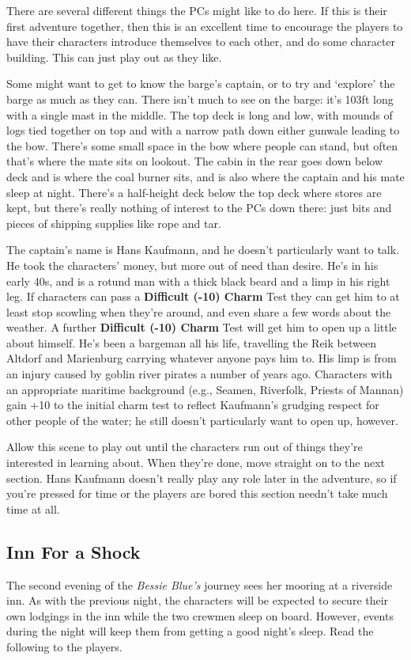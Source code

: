 There are several different things the PCs might like to do here. If this is
their first adventure together, then this is an excellent time to encourage the
players to have their characters introduce themselves to each other, and do some
character building. This can just play out as they like.

Some might want to get to know the barge's captain, or to try and `explore' the
barge as much as they can. There isn't much to see on the barge: it's 103ft long
with a single mast in the middle. The top deck is long and low, with mounds of
logs tied together on top and with a narrow path down either gunwale leading to
the bow. There's some small space in the bow where people can stand, but often
that's where the mate sits on lookout. The cabin in the rear goes down below
deck and is where the coal burner sits, and is also where the captain and his
mate sleep at night. There's a half-height deck below the top deck where stores
are kept, but there's really nothing of interest to the PCs down there: just
bits and pieces of shipping supplies like rope and tar.

The captain's name is Hans Kaufmann, and he doesn't particularly want to talk.
He took the characters' money, but more out of need than desire. He's in his
early 40s, and is a rotund man with a thick black beard and a limp in his right
leg. If characters can pass a \textbf{Difficult \mbox{(-10)} Charm} Test they can
get him to at least stop scowling when they're around, and even share a few
words about the weather. A further \textbf{Difficult (-10) Charm} Test will
get him to open up a little about himself. He's been a bargeman all his life,
travelling the Reik between Altdorf and Marienburg carrying whatever anyone pays
him to. His limp is from an injury caused by goblin river pirates a number of
years ago. Characters with an appropriate maritime background (e.g., Seamen,
Riverfolk, Priests of Mannan) gain +10 to the initial charm test to reflect
Kaufmann's grudging respect for other people of the water; he still doesn't
particularly want to open up, however.

Allow this scene to play out until the characters run out of things they're
interested in learning about. When they're done, move straight on to the
next section. Hans Kaufmann doesn't really play any role later in the adventure,
so if you're pressed for time or the players are bored this section needn't take
much time at all.

\subsection{Inn For a Shock}\label{act1scene2}
The second evening of the \textit{Bessie Blue's} journey sees her mooring at
a riverside inn. As with the previous night, the characters will be expected to
secure their own lodgings in the inn while the two crewmen sleep on board.
However, events during the night will keep them from getting a good night's
sleep. Read the following to the players.

